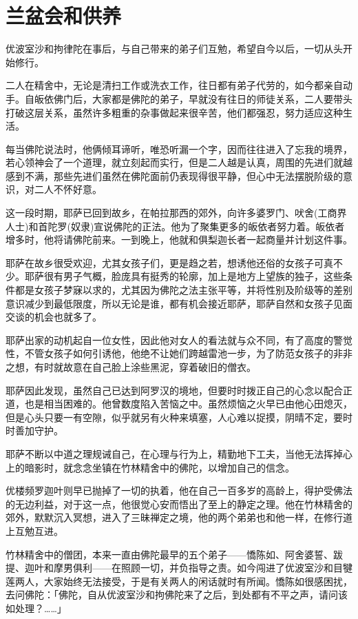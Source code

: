 \documentclass[twoside,openany]{book}
\begin{document}
\section{兰盆会和供养}\label{sec3.16}

优波室沙和拘律陀在事后，与自己带来的弟子们互勉，希望自今以后，一切从头开始修行。

二人在精舍中，无论是清扫工作或洗衣工作，往日都有弟子代劳的，如今都亲自动手。自皈依佛门后，大家都是佛陀的弟子，早就没有往日的师徒关系，二人要带头打破这层关系，虽然许多粗重的杂事做起来很辛苦，他们都强忍，努力适应这种生活。

每当佛陀说法时，他俩倾耳谛听，唯恐听漏一个字，因而往往进入了忘我的境界，若心领神会了一个道理，就立刻起而实行，但是二人越是认真，周围的先进们就越感到不满，那些先进们虽然在佛陀面前仍表现得很平静，但心中无法摆脱阶级的意识，对二人不怀好意。

这一段时期，耶萨已回到故乡，在帕拉那西的郊外，向许多婆罗门、吠舍(工商界人士)和首陀罗(奴隶)宣说佛陀的正法。他为了聚集更多的皈依者努力着。皈依者增多时，他将请佛陀前来。一到晚上，他就和俱梨迦长者一起商量并计划这件事。

耶萨在故乡很受欢迎，尤其女孩子们，更是趋之若，想诱他还俗的女孩子可真不少。耶萨很有男子气概，脸庞具有挺秀的轮廓，加上是地方上望族的独子，这些条件都是女孩子梦寐以求的，尤其因为佛陀之法主张平等，并将性别及阶级等的差别意识减少到最低限度，所以无论是谁，都有机会接近耶萨，耶萨自然和女孩子见面交谈的机会也就多了。

耶萨出家的动机起自一位女性，因此他对女人的看法就与众不同，有了高度的警觉性，不管女孩子如何引诱他，他绝不让她们跨越雷池一步，为了防范女孩子的非非之想，有时就故意在自己脸上涂些黑泥，穿着破旧的僧衣。

耶萨因此发现，虽然自己已达到阿罗汉的境地，但要时时拨正自己的心念以配合正道，也是相当困难的。他曾数度陷入苦恼之中。虽然烦恼之火早已由他心田熄灭，但是心头只要一有空隙，似乎就另有火种来填塞，人心难以捉摸，阴晴不定，要时时善加守护。

耶萨不断以中道之理规诫自己，在心理与行为上，精勤地下工夫，当他无法挥掉心上的暗影时，就念念坐镇在竹林精舍中的佛陀，以增加自己的信念。

优楼频罗迦叶则早已抛掉了一切的执着，他在自己一百多岁的高龄上，得护受佛法的无边利益，对于这一点，他很觉心安而悟出了至上的静定之理。他在竹林精舍的郊外，默默沉入冥想，进入了三昧禅定之境，他的两个弟弟也和他一样，在修行道上互勉互进。

竹林精舍中的僧团，本来一直由佛陀最早的五个弟子——憍陈如、阿舍婆誓、跋提、迦叶和摩男俱利——在照顾一切，并负指导之责。如今闯进了优波室沙和目犍莲两人，大家始终无法接受，于是有关两人的闲话就时有所闻。憍陈如很感困扰，去问佛陀：「佛陀，自从优波室沙和拘佛陀来了之后，到处都有不平之声，请问该如处理？……」
\end{document}
